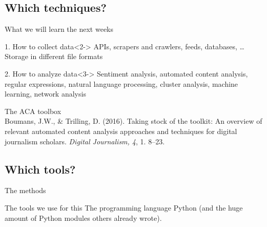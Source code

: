 \documentclass{beamer}
\begin{document}
\subsection{Which techniques?}

\begin{frame}{What we will learn the next weeks}
\begin{block}{1. How to collect data}<2->
APIs, scrapers and crawlers, feeds, databases, \ldots \\
Storage in different file formats
\end{block}
\begin{block}{2. How to analyze data}<3->
Sentiment analysis, automated content analysis, regular expressions, natural language processing, cluster analysis,  machine learning, network analysis
\end{block}
\end{frame}


\begin{frame}{The ACA toolbox}
	\\
	\tiny
	Boumans, J.W., \& Trilling, D. (2016). Taking stock of the toolkit: An overview of relevant automated content analysis approaches and techniques for digital journalism scholars. \emph{Digital Journalism, 4}, 1. 8--23.
\end{frame}


\subsection{Which tools?}


\begin{frame}{The methods}
\begin{block}{The tools we use for this}
The programming language Python (and the huge amount of Python modules others already wrote).
\end{block}
\end{frame}
\end{document}
